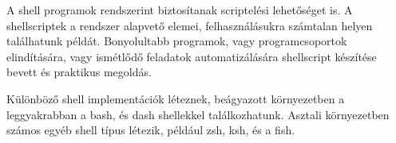 A shell programok rendszerint biztosítanak scriptelési lehetőséget is. A
shellscriptek a rendszer alapvető elemei, felhasználásukra számtalan helyen
találhatunk példát. Bonyolultabb programok, vagy programcsoportok elindítására,
vagy ismétlődő feladatok automatizálására shellscript készítése bevett és
praktikus megoldás.

Különböző shell implementációk léteznek, beágyazott környezetben a leggyakrabban
a bash, és dash shellekkel találkozhatunk. Asztali környezetben számos egyéb
shell típus létezik, például zsh, ksh, és a fish.







